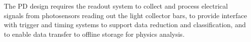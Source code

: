 

The PD design requires the readout system to collect and process electrical signals from photosensors reading out the light collector bars, 
to provide interface with trigger and timing systems to support data reduction and classification, and to enable data transfer 
to offline storage for physics analysis.

